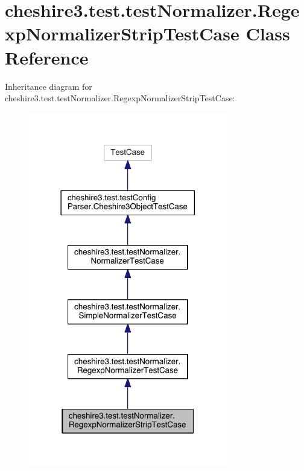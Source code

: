 \hypertarget{classcheshire3_1_1test_1_1test_normalizer_1_1_regexp_normalizer_strip_test_case}{\section{cheshire3.\-test.\-test\-Normalizer.\-Regexp\-Normalizer\-Strip\-Test\-Case Class Reference}
\label{classcheshire3_1_1test_1_1test_normalizer_1_1_regexp_normalizer_strip_test_case}
}


Inheritance diagram for cheshire3.\-test.\-test\-Normalizer.\-Regexp\-Normalizer\-Strip\-Test\-Case\-:
\nopagebreak
\begin{figure}[H]
\begin{center}
\leavevmode
\includegraphics[width=246pt]{classcheshire3_1_1test_1_1test_normalizer_1_1_regexp_normalizer_strip_test_case__inherit__graph}
\end{center}
\end{figure}


